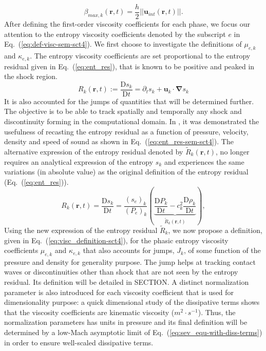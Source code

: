 \documentclass[preprint,10pt]{elsarticle}
\newcommand{\grad}{\mbold{\nabla}}
\newcommand{\mbold}[1]{\boldsymbol#1}
\newcommand{\resi}{R}
\newcommand{\resinew}{\widetilde{\resi}}
\newcommand{\matder}[1]{\frac{\textrm{D} #1}{\textrm{D} t}}
\newcommand{\eqt}[1]{Eq.~(\ref{#1})}                     %
\begin{document}
%
%
\begin{equation}\label{eq:def-beta-max-sen-sect4}
\beta_{max,k}( \mbold r, t) = \frac{h}{2} || \mbold u_{int}( \mbold r, t) ||.
\end{equation}
%
After defining the first-order viscosity coefficients for each phase, we focus our attention to the entropy viscosity coefficients denoted by the subscript $e$ in \eqt{eq:def-visc-sem-sct4}. We first choose to investigate the definitions of $\mu_{e,k}$ and $\kappa_{e,k}$. The entropy viscosity coefficients are set proportional to the entropy residual given in \eqt{eq:ent_res}, that is known to be positive and peaked in the shock region. 
%
\begin{equation}\label{eq:ent_res}
\resi_k(\mbold r,t) := \matder{s_k} =  \partial_t s_k + \mbold u_k \cdot \grad s_k
\end{equation}
%
It is also accounted for the jumps of quantities that will be determined further. The objective is to be able to track spatially and temporally any shock and discontinuity forming in the computational domain. In \cite{Marco_paper_low_mach}, it was demonstrated the usefulness of recasting the entropy residual as a function of pressure, velocity, density and speed of sound as shown in \eqt{eq:ent_res-sem-sct4}. The alternative expression of the entropy residual denoted by $\resinew_k(\mbold r,t)$, no longer requires an analytical expression of the entropy $s_k$ and experiences the same variations (in absolute value) as the original definition of the entropy residual (\eqt{eq:ent_res}).
%
\begin{equation}\label{eq:ent_res-sem-sct4}
\resi_k(\mbold r,t)  = \matder{s_k} = \frac{(s_e)_k}{(P_e)_k} \left( \underbrace{\matder{P_k} - c_k^2 \matder{\rho_k} }_{\resinew_k(\mbold r,t)} \right) ,
\end{equation} 
%
Using the new expression of the entropy residual $\resinew_k$, we now propose a definition, given in \eqt{eq:visc_definition-sct4}, for the phasic entropy viscosity coefficients $\mu_{e,k}$ and $\kappa_{e,k}$ that also accounts for jumps, $J_k$, of some function of the pressure and density for generality purpose. The jump helps at tracking contact waves or discontinuities other than shock that are not seen by the entropy residual. Its definition will be detailed in SECTION. A distinct normalization parameter is also introduced for each viscosity coefficient that is used for dimensionality purpose: a quick dimensional study of the dissipative terms shows that the viscosity coefficients are kinematic viscosity ($m^2 \cdot s^{-1}$). Thus, the normalization parameters has units in pressure and its final definition will be determined by a low-Mach asymptotic limit of \eqt{eq:sev_equ-with-diss-terms} in order to ensure well-scaled dissipative terms.
\end{document}
